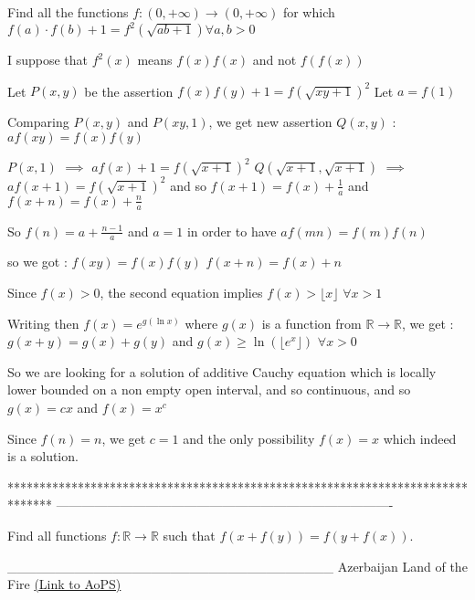 \begin{solution}
	\begin{tcolorbox}Find all the functions $f:(0,+\infty)\to(0,+\infty)$ for which $f(a)\cdot f(b)+1=f^2\left( \sqrt{ab+1} \right ) \forall a,b>0$\end{tcolorbox}
I suppose that $f^2(x)$ means $f(x)f(x)$ and not $f(f(x))$

Let $P(x,y)$ be the assertion $f(x)f(y)+1=f(\sqrt{xy+1})^2$
Let $a=f(1)$

Comparing $P(x,y)$ and $P(xy,1)$, we get new assertion $Q(x,y)$ : $af(xy)=f(x)f(y)$

$P(x,1)$ $\implies$ $af(x)+1=f(\sqrt{x+1})^2$
$Q(\sqrt{x+1},\sqrt{x+1})$ $\implies$ $af(x+1)=f(\sqrt{x+1})^2$
and so $f(x+1)=f(x)+\frac 1a$ and $f(x+n)=f(x)+\frac na$

So $f(n)=a+\frac{n-1}a$ and $a=1$ in order to have $af(mn)=f(m)f(n)$

so we got :
$f(xy)=f(x)f(y)$
$f(x+n)=f(x)+n$

Since $f(x)>0$, the second equation implies $f(x)>\lfloor x\rfloor$ $\forall x>1$

Writing then $f(x)=e^{g(\ln x)}$ where $g(x)$ is a function from $\mathbb R\to\mathbb R$, we get :
$g(x+y)=g(x)+g(y)$ and $g(x)\ge \ln(\lfloor e^x\rfloor)$ $\forall x>0$

So we are looking for a solution of additive Cauchy equation which is locally lower bounded on a non empty open interval, and so continuous, and so $g(x)=cx$ and $f(x)=x^c$

Since $f(n)=n$, we get $c=1$ and the only possibility $\boxed{f(x)=x}$ which indeed is a solution.
\end{solution}
*******************************************************************************
-------------------------------------------------------------------------------

\begin{problem}
	Find all functions $f: \mathbb{R}\to\mathbb{R}$  such that $f(x+f(y))=f(y+f(x))$.

__________________________________
Azerbaijan Land of the Fire 
	\flushright \href{https://artofproblemsolving.com/community/c6h529209}{(Link to AoPS)}
\end{problem}



